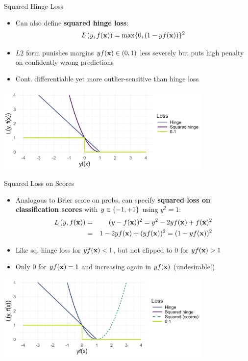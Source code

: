 \documentclass[11pt,compress,t,notes=noshow, xcolor=table]{beamer}
\begin{document}
\begin{vbframe}{Squared Hinge Loss}

\begin{itemize}
  \item Can also define \textbf{squared hinge loss}:
  $$L\left(y, f(\mathbf{x})\right) = \max \{ 0, (1 - yf(\mathbf{x}))\}^2$$
  \item $L2$ form punishes margins $yf(\mathbf{x}) \in (0, 1)$ less severely but puts high penalty on confidently wrong predictions
  \item Cont. differentiable yet more outlier-sensitive than hinge loss
\end{itemize}

\begin{center}
\includegraphics[width = 0.8\textwidth]{figure/overview_classif_subset2.png}
\end{center}

\end{vbframe}


\begin{vbframe}{Squared Loss on Scores}


\begin{itemize}
  \item Analogous to Brier score on probs, can specify \textbf{squared loss on classification scores} with $y \in \{-1, +1\}$ using $y^2=1$:
  \begin{eqnarray*}
  L\left(y, f(\mathbf{x})\right) &=&(y - f(\mathbf{x}))^2 = y^2 - 2yf(\mathbf{x}) + f(\mathbf{x})^2\\
  &=&1 - 2yf(\mathbf{x}) + (yf(\mathbf{x}))^2 = (1 - yf(\mathbf{x}))^2
  \end{eqnarray*}
  \item Like sq. hinge loss for $yf(\mathbf{x}) < 1$, but not clipped to $0$ for $yf(\mathbf{x})>1$
  \item Only 0 for $yf(\mathbf{x}) = 1$ and increasing again in $yf(\mathbf{x})$ (undesirable!)
\end{itemize}

\begin{center}
\includegraphics[width = 0.8\textwidth]{figure/overview_classif_subset3.png}
\end{center}

\end{vbframe}
\end{document}
